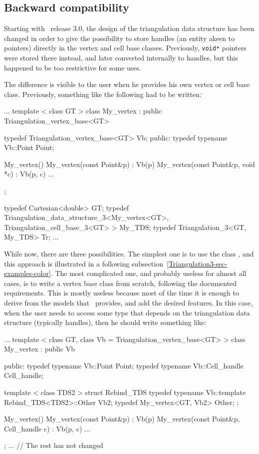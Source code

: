 \subsection{Backward compatibility}
\label{T3-sec-compat}

Starting with \cgal\ release 3.0, the design of the triangulation data
structure has been changed in order to give the possibility to store handles
(an entity akeen to pointers) directly in the vertex and cell base classes.
Previously, \texttt{void*} pointers were stored there instead, and later
converted internally to handles, but this happened to be too restrictive for
some uses.

The difference is visible to the user when he provides his own vertex or cell
base class.  Previously, something like the following had to be written:

\begin{ccExampleCode}
...
template < class GT >
class My_vertex
  : public Triangulation_vertex_base<GT>
{
  typedef Triangulation_vertex_base<GT>  Vb;
public:
  typedef typename Vb::Point             Point;

  My_vertex() {}
  My_vertex(const Point&p)          : Vb(p) {}
  My_vertex(const Point&p, void *c) : Vb(p, c) {}
...
};

typedef Cartesian<double>                                               GT;
typedef Triangulation_data_structure_3<My_vertex<GT>,
                                       Triangulation_cell_base_3<GT> >  My_TDS;
typedef Triangulation_3<GT, My_TDS>                                     Tr;
...
\end{ccExampleCode}

While now, there are three possibilities.  The simplest one is to use the
class , and this approach is
illustrated in a following subsection~\ref{Triangulation3-sec-examples-color}.
The most complicated one, and probably useless for almost all cases, is to
write a vertex base class from scratch, following the documented requirements.
This is mostly useless because most of the time it is enough to derive from
the models that \cgal\ provides, and add the desired features.
In this case, when the user needs to access some type that depends on the
triangulation data structure (typically handles), then he should write
something like:
\begin{ccExampleCode}
...
template < class GT, class Vb = Triangulation_vertex_base<GT> >
class My_vertex
  : public Vb
{
public:
  typedef typename Vb::Point           Point;
  typedef typename Vb::Cell_handle     Cell_handle;

  template < class TDS2 >
  struct Rebind_TDS {
    typedef typename Vb::template Rebind_TDS<TDS2>::Other  Vb2;
    typedef My_vertex<GT, Vb2>                             Other;
  };

  My_vertex() {}
  My_vertex(const Point&p)                : Vb(p) {}
  My_vertex(const Point&p, Cell_handle c) : Vb(p, c) {}
...
};
... // The rest has not changed
\end{ccExampleCode}

